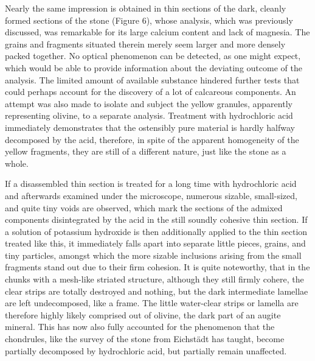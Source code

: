 \documentclass[a4paper, 12pt, oneside]{article}
\begin{document}
Nearly the same impression is obtained in thin sections of the dark, cleanly formed sections of the stone (Figure 6), whose analysis, which was previously discussed, was remarkable for its large calcium content and lack of magnesia. The grains and fragments situated therein merely seem larger and more densely packed together. No optical phenomenon can be detected, as one might expect, which would be able to provide information about the deviating outcome of the analysis. The limited amount of available substance hindered further tests that could perhaps account for the discovery of a lot of calcareous components. An attempt was also made to isolate and subject the yellow granules, apparently representing olivine, to a separate analysis. Treatment with hydrochloric acid immediately demonstrates that the ostensibly pure material is hardly halfway decomposed by the acid, therefore, in spite of the apparent homogeneity of the yellow fragments, they are still of a different nature, just like the stone as a whole.

If a disassembled thin section is treated for a long time with hydrochloric acid and afterwards examined under the microscope, numerous sizable, small-sized, and quite tiny voids are observed, which mark the sections of the admixed components disintegrated by the acid in the still soundly cohesive thin section. If a solution of potassium hydroxide is then additionally applied to the thin section treated like this, it immediately falls apart into separate little pieces, grains, and tiny particles, amongst which the more sizable inclusions arising from the small fragments stand out due to their firm cohesion. It is quite noteworthy, that in the chunks with a mesh-like striated structure, although they still firmly cohere, the clear strips are totally destroyed and nothing, but the dark intermediate lamellae are left undecomposed, like a frame. The little water-clear strips or lamella are therefore highly likely comprised out of olivine, the dark part of an augite mineral. This has now also fully accounted for the phenomenon that the chondrules, like the survey of the stone from Eichstädt has taught, become partially decomposed by hydrochloric acid, but partially remain unaffected.
\clearpage

\subsubsection{}
\end{document}
